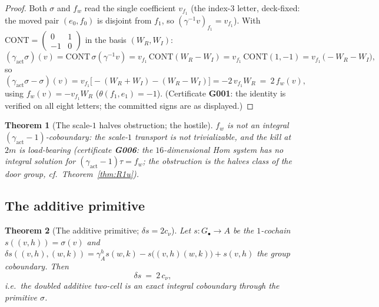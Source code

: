 \documentclass[11pt]{article}
\newtheorem{theorem}{Theorem}[section]
\begin{document}
\begin{proof}
Both $\sigma$ and $f_w$ read the single coefficient $v_{f_1}$ (the
index-$3$ letter, deck-fixed: the moved pair $(e_0,f_0)$ is disjoint
from $f_1$, so $(\gamma^{-1}v)_{f_1}=v_{f_1}$). With
$\mathrm{CONT}=\left(\begin{smallmatrix}0&1\\-1&0\end{smallmatrix}\right)$
in the basis $(W_R,W_I)$:
\[
(\gamma_{\mathrm{act}}\sigma)(v)
=\mathrm{CONT}\,\sigma(\gamma^{-1}v)
=v_{f_1}\,\mathrm{CONT}(W_R-W_I)
=v_{f_1}\,\mathrm{CONT}(1,-1)
=v_{f_1}\,\bigl(-W_R-W_I\bigr),
\]
so
\[
(\gamma_{\mathrm{act}}\sigma-\sigma)(v)
= v_{f_1}\bigl[-(W_R+W_I)-(W_R-W_I)\bigr]
= -2\,v_{f_1}W_R\ =\ 2\,f_w(v),
\]
using $f_w(v)=-v_{f_1}W_R$ ($\theta(f_1,e_1)=-1$). (Certificate
\textbf{G001}: the identity is verified on all eight letters; the
committed signs are as displayed.)
\end{proof}

\begin{theorem}[The scale-$1$ halves obstruction; the hostile]
\label{thm:halves}
$f_w$ is \emph{not} an integral
$(\gamma_{\mathrm{act}}-1)$-coboundary: the scale-$1$ transport is not
trivializable, and the kill at $2m$ is load-bearing
(certificate \textbf{G006}: the $16$-dimensional Hom system has no
integral solution for $(\gamma_{\mathrm{act}}-1)\tau=f_w$; the
obstruction is the halves class of the door group, cf.\
Theorem~\ref{thm:R1u}).
\end{theorem}

\subsection{The additive primitive}

\begin{theorem}[The additive primitive; $\delta s=2c_\nu$]
\label{thm:additive}
Let $s\colon G_\bullet\to A$ be the $1$-cochain
$s((v,h))=\sigma(v)$ and
$\delta s((v,h),(w,k))=\gamma_A^h s(w,k)-s\bigl((v,h)(w,k)\bigr)+s(v,h)$
the group coboundary. Then
\[
\delta s\ =\ 2\,c_\nu,
\]
i.e.\ the doubled additive two-cell is an exact integral coboundary
through the primitive $\sigma$.
\end{theorem}
\end{document}

